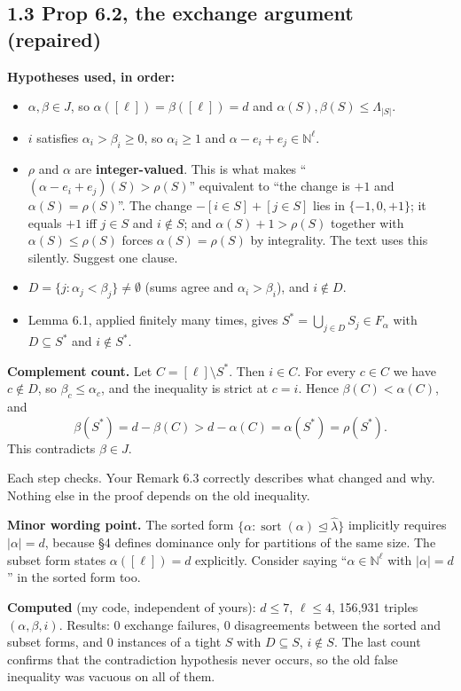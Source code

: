 \documentclass[11pt]{amsart}
\newcommand{\lh}{\hat\lambda}
\newcommand{\N}{\mathbb{N}}
\newcommand{\sort}{\operatorname{sort}}
\newcommand{\dom}{\trianglelefteq}
\newcommand{\ok}{\ \checkmark}
\begin{document}
\subsection*{1.3 Prop 6.2, the exchange argument (repaired)}
\textbf{Hypotheses used, in order:}
\begin{itemize}[leftmargin=2.5em]
\item[(H1)] $\alpha,\beta\in J$, so $\alpha([\ell])=\beta([\ell])=d$ and $\alpha(S),\beta(S)\le\Lambda_{|S|}$.
\item[(H2)] $i$ satisfies $\alpha_i>\beta_i\ge0$, so $\alpha_i\ge1$ and $\alpha-e_i+e_j\in\N^\ell$.
\item[(H3)] $\rho$ and $\alpha$ are \textbf{integer-valued}. This is what makes ``$(\alpha-e_i+e_j)(S)>\rho(S)$'' equivalent to ``the change is $+1$ and $\alpha(S)=\rho(S)$''. The change $-[i\in S]+[j\in S]$ lies in $\{-1,0,+1\}$; it equals $+1$ iff $j\in S$ and $i\notin S$; and $\alpha(S)+1>\rho(S)$ together with $\alpha(S)\le\rho(S)$ forces $\alpha(S)=\rho(S)$ by integrality. The text uses this silently. Suggest one clause.
\item[(H4)] $D=\{j:\alpha_j<\beta_j\}\ne\emptyset$ (sums agree and $\alpha_i>\beta_i$), and $i\notin D$.
\item[(H5)] Lemma 6.1, applied finitely many times, gives $S^*=\bigcup_{j\in D}S_j\in F_\alpha$ with $D\subseteq S^*$ and $i\notin S^*$.
\end{itemize}

\noindent\textbf{Complement count.} Let $C=[\ell]\setminus S^*$. Then $i\in C$. For every $c\in C$ we have $c\notin D$, so $\beta_c\le\alpha_c$, and the inequality is strict at $c=i$. Hence $\beta(C)<\alpha(C)$, and
\[
\beta(S^*)=d-\beta(C)>d-\alpha(C)=\alpha(S^*)=\rho(S^*).
\]
This contradicts $\beta\in J$.\ok

Each step checks. Your Remark 6.3 correctly describes what changed and why. Nothing else in the proof depends on the old inequality.

\smallskip\noindent\textbf{Minor wording point.} The sorted form $\{\alpha:\sort(\alpha)\dom\lh\}$ implicitly requires $|\alpha|=d$, because \S4 defines dominance only for partitions of the same size. The subset form states $\alpha([\ell])=d$ explicitly. Consider saying ``$\alpha\in\N^\ell$ with $|\alpha|=d$'' in the sorted form too.

\smallskip\noindent\textbf{Computed} (my code, independent of yours): $d\le7$, $\ell\le4$, 156{,}931 triples $(\alpha,\beta,i)$. Results: 0 exchange failures, 0 disagreements between the sorted and subset forms, and 0 instances of a tight $S$ with $D\subseteq S$, $i\notin S$. The last count confirms that the contradiction hypothesis never occurs, so the old false inequality was vacuous on all of them.
\end{document}
